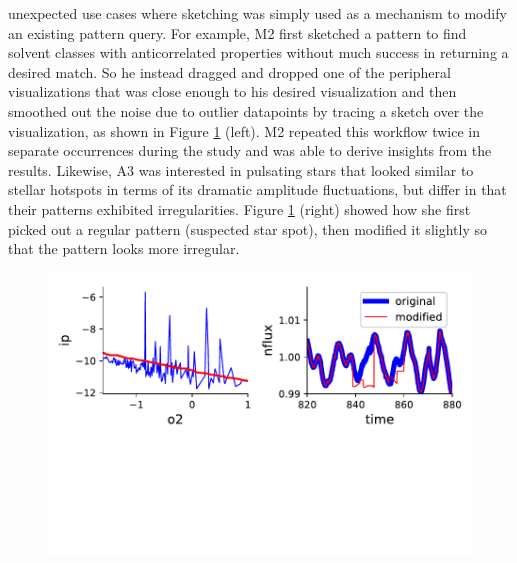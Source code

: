 unexpected use cases where sketching was simply used as a mechanism to modify an existing pattern query. For example, M2 first sketched a pattern to find solvent classes with anticorrelated properties without much success in returning a desired match.
So he instead dragged and dropped one of the peripheral visualizations that was close enough to his desired visualization and then smoothed out the noise due to outlier datapoints by tracing a sketch over the visualization, as shown in Figure \ref{query_modification} (left). M2 repeated this workflow twice in separate occurrences during the study and was able to derive insights from the results. Likewise, A3 was interested in pulsating stars that looked similar to stellar hotspots in terms of its dramatic amplitude fluctuations, but differ in that their patterns exhibited irregularities. Figure \ref{query_modification} (right) showed how she first picked out a regular pattern (suspected star spot), then modified it slightly so that the pattern looks more irregular.
\begin{figure}[h!]
    \centering
    \includegraphics[width=\columnwidth]{figures/QueryModificationBySketch.pdf}
    \caption{
    \label{query_modification}}
    \vspace{-10pt}
\end{figure}
